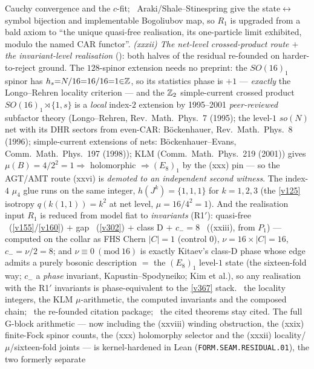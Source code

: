 Cauchy convergence and the $c$-fit; \mC\ Araki/Shale--Stinespring give the state$\leftrightarrow$symbol bijection and
implementable Bogoliubov map, so $R_1$ is upgraded from a bald axiom to ``the unique quasi-free realisation, its
one-particle limit exhibited, modulo the named CAR functor''. \emph{(xxxii) The net-level crossed-product route
$+$ the invariant-level realisation} (): both halves of the residual
re-founded on harder-to-reject ground. The $128$-spinor extension needs no preprint: the $SO(16)_1$ spinor has
$h_s{=}N/16{=}16/16{=}1{\in}\mathbb Z$, so its statistics phase is $+1$ --- \emph{exactly} the Longo--Rehren locality
criterion --- and the $\mathbb Z_2$ simple-current crossed product $SO(16)_1{\rtimes}\{1,s\}$ is a \emph{local} index-$2$
extension by 1995--2001 \emph{peer-reviewed} subfactor theory (Longo--Rehren, Rev.\ Math.\ Phys.\ 7 (1995); the
level-$1$ $so(N)$ net with its DHR sectors from even-CAR: B\"ockenhauer, Rev.\ Math.\ Phys.\ 8 (1996);
simple-current extensions of nets: B\"ockenhauer--Evans, Comm.\ Math.\ Phys.\ 197 (1998)); KLM (Comm.\ Math.\
Phys.\ 219 (2001)) gives $\mu(B){=}4/2^2{=}1\Rightarrow$ holomorphic $\Rightarrow(E_8)_1$ by the (xxx) pin ---
so the AGT/AMT route (xxvi) is \emph{demoted to an independent second witness}. The index-$4$ $\mu_4$ glue runs on
the same integer, $h(J^k){=}\{1,1,1\}$ for $k{=}1,2,3$ (the \vref{v125} isotropy $q(k(1,1)){=}k^2$ at net level,
$\mu{=}16/4^2{=}1$). And the realisation input $R_1$ is reduced from model fiat to \emph{invariants}
(R1$'$): quasi-free \mC\ (\vref{v155}/\vref{v160}) $+$ gap \mE\ (\vref{v302}) $+$ class D $+$ $c_-{=}8$ \mE\
((xxiii), from $P_1$) --- computed on the collar as FHS Chern $|C|{=}1$ (control $0$), $\nu{=}16{\times}|C|{=}16$,
$c_-{=}\nu/2{=}8$; and $\nu{\equiv}0\ (\mathrm{mod}\ 16)$ is exactly Kitaev's class-D phase whose edge admits a
purely bosonic description $=$ the $(E_8)_1$ level-$1$ state (the sixteen-fold way; $c_-$ a \emph{phase} invariant,
Kapustin--Spodyneiko; Kim et al.), so any realisation with the R1$'$ invariants is phase-equivalent to the
\vref{v367} stack. \mE\ the locality integers, the KLM $\mu$-arithmetic, the computed invariants and the composed
chain; \mC\ the re-founded citation package; \mO\ the cited theorems stay cited. The full G-block
arithmetic --- now including the (xxviii) winding obstruction, the (xxix) finite-Fock spinor counts, the (xxx)
holomorphy selector and the (xxxii) locality/$\mu$/sixteen-fold joints --- is kernel-hardened in Lean
(\texttt{FORM.SEAM.RESIDUAL.01}), the two formerly separate
